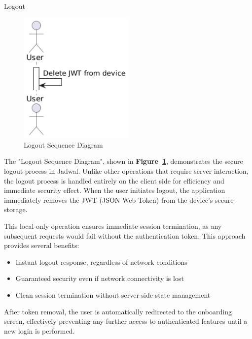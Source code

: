 \begin{usecase}{Logout}
\end{usecase}

\begin{figure}[!h]
  \centering
  \includegraphics[width=0.5\textwidth]{images/docs/diagrams/sequence-diagrams/all-sequence-diagrams/Logout.png}
  \caption{Logout Sequence Diagram}
  \label{fig:seq/logout}
\end{figure}

The "Logout Sequence Diagram", shown in \textbf{Figure~\ref{fig:seq/logout}}, demonstrates the secure logout process in Jadwal. Unlike other operations that require server interaction, the logout process is handled entirely on the client side for efficiency and immediate security effect. When the user initiates logout, the application immediately removes the JWT (JSON Web Token) from the device's secure storage.

This local-only operation ensures immediate session termination, as any subsequent requests would fail without the authentication token. This approach provides several benefits:
\begin{itemize}
  \item Instant logout response, regardless of network conditions
  \item Guaranteed security even if network connectivity is lost
  \item Clean session termination without server-side state management
\end{itemize}

After token removal, the user is automatically redirected to the onboarding screen, effectively preventing any further access to authenticated features until a new login is performed.